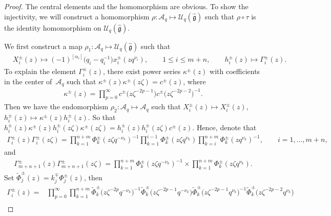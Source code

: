 \documentclass[10pt,a4paper]{amsart}
\numberwithin{equation}{section}
\begin{document}
\begin{proof}
 The central elements and the homomorphism are obvious. To show the injectivity, we will construct a homomorphism $\rho\colon \mathcal{A}_q\mapsto \mathcal{U}_q(\mathfrak{\hat{g}})$ such that $\rho\circ\tau$ is the identity homomorphism on $\mathcal{U}_q(\mathfrak{\hat{g}})$.

We first construct a map $\rho_1\colon \mathcal{A}_q\mapsto \mathcal{U}_q(\mathfrak{\hat{g}})$ such that
\begin{align*}
 & X_i^{\pm}(z)\mapsto (-1)^{[\alpha_{i}]}\bigl(q_i-q_i^{-1}\bigr)x_i^{\pm}(zq^{\nu_i}),\qquad 1\leq i\leq m+n,\qquad h_i^{\pm}(z)\mapsto \Gamma_i^{\pm}(z).
\end{align*}
To explain the element $\Gamma_i^{\pm}(z)$, there exist power series $\kappa^{\pm}(z)$ with coefficients in the center of~$\mathcal{A}_q$ such that $\kappa^{\pm}(z)\kappa^{\pm}(z\zeta)=c^{\pm}(z)$, where
\begin{gather}\label{kappa}
 \kappa^{\pm}(z)=\prod\limits_{p=0}^{\infty}c^{\pm}\bigl(z\zeta^{-2p-1}\bigr)c^{\pm}\bigl(z\zeta^{-2p-2}\bigr)^{-1}.
\end{gather}
Then we have the endomorphism $\rho_2\colon \mathcal{A}_q\mapsto\mathcal{A}_q$ such that $X_i^{\pm}(z)\mapsto X_i^{\pm}(z)$, $h_i^{\pm}(z)\mapsto \kappa^{\pm}(z)h_i^{\pm}(z)$. So that
$h_i^{\pm}(z)\kappa^{\pm}(z)h_i^{\pm}(z\zeta)\kappa^{\pm}(z\zeta)=h_i^{\pm}(z)h_i^{\pm}(z\zeta)c^{\pm}(z)$.
Hence, denote that
\begin{gather*}
 \Gamma_i^{\pm}(z)\Gamma_i^{\pm}(z\zeta)=\prod\limits_{k=1}^{n+m}\Phi^{\pm}_{k}(z\zeta q^{-\nu_k})^{-1}\prod\limits_{k=1}^{i-1}\Phi^{\pm}_{k}(z\zeta q^{\nu_k})\prod\limits_{k=i}^{n+m}\Phi^{\pm}_{k}(z q^{\nu_k})^{-1},\qquad i=1,\dots,m+n,
\end{gather*}
and
\begin{gather*}
 \Gamma_{m+n+1}^{\pm}(z)\Gamma_{m+n+1}^{\pm}(z\zeta)=\prod\limits_{k=1}^{n+m}\Phi^{\pm}_{k}(z\zeta q^{-\nu_k})^{-1}
 \times\prod\limits_{k=1}^{n+m}\Phi^{\pm}_{k}(z\zeta q^{\nu_k}).
\end{gather*}
Set $\widetilde{\Phi}^{\pm}_{j}(z)=k^{\mp}_j\Phi^{\pm}_{j}(z)$, then
\begin{align*}
 \Gamma_i^{\pm}(z)={}&\prod\limits_{p=0}^{\infty}\prod\limits_{k=1}^{n+m}\widetilde{\Phi}^{\pm}_{k}\bigl(z\zeta^{-2p} q^{-\nu_k}\bigr)^{-1}\widetilde{\Phi}^{\pm}_{k}\bigl(z\zeta^{-2p-1} q^{-\nu_k}\bigr)\widetilde{\Phi}^{\pm}_{k}\bigl(z\zeta^{-2p-1} q^{\nu_k}\bigr)^{-1}\widetilde{\Phi}^{\pm}_{k}\bigl(z\zeta^{-2p-2} q^{\nu_k}\bigr)\\

\end{align*}
\end{proof}
\end{document}
